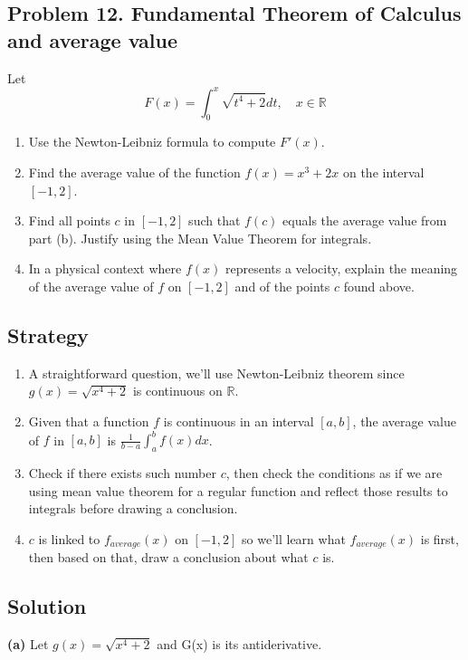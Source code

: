\subsection{Problem 12. Fundamental Theorem of Calculus and average value}
Let
\[F(x)=\displaystyle\int_{0}^{x}\sqrt{t^{4}+2}dt, \quad x\in\mathbb{R}\]

\begin{enumerate}[label=(\alph*)]
    \item Use the Newton-Leibniz formula to compute $F'(x)$.
    \item Find the average value of the function $f(x) = x^3 + 2x$ on the interval $[-1, 2]$.
    \item Find all points $c$ in $[-1, 2]$ such that $f(c)$ equals the average value from part (b). Justify using the Mean Value Theorem for integrals.
    \item In a physical context where $f(x)$ represents a velocity, explain the meaning of the average value of $f$ on $[-1, 2]$ and of the points $c$ found above.
\end{enumerate}

\subsection*{Strategy}

\begin{enumerate}[label=(\alph*)]
    \item A straightforward question, we'll use Newton-Leibniz theorem since $g(x) = \sqrt{x^4 + 2}$ is continuous on $\mathbb{R}$.
    \item Given that a function $f$ is continuous in an interval $[a, b]$, the average value of $f$ in $[a, b]$ is $\frac{1}{b - a}\int_a^b f(x) dx$.
    \item Check if there exists such number $c$, then check the conditions as if we are using mean value theorem for a regular function and reflect those results to integrals before drawing a conclusion.
    \item $c$ is linked to $f_{average}(x)$ on $[-1, 2]$ so we'll learn what $f_{average}(x)$ is first, then based on that, draw a conclusion about what $c$ is.
\end{enumerate}

\subsection*{Solution}

\textbf{(a)} Let $g(x) = \sqrt{x^4 + 2}$ and G(x) is its antiderivative.

